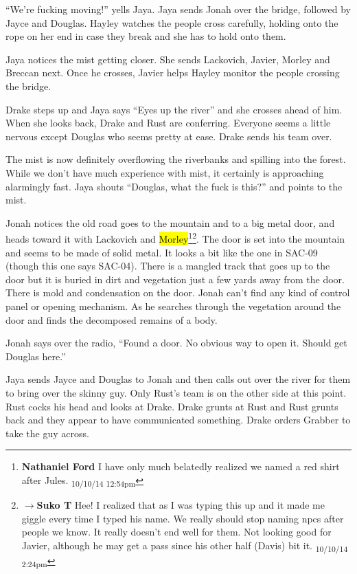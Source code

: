 ``We're fucking moving!'' yells Jaya.  Jaya sends Jonah over the bridge, followed by Jayce and Douglas.   Hayley watches the people cross carefully, holding onto the rope on her end in case they break and she has to hold onto them.

Jaya notices the mist getting closer.  She sends Lackovich, Javier, Morley and Breccan next.  Once he crosses, Javier helps Hayley monitor the people crossing the bridge.  

Drake steps up and Jaya says ``Eyes up the river'' and she crosses ahead of him.  When she looks back, Drake and Rust are conferring.  Everyone seems a little nervous except Douglas who seems pretty at ease.  Drake sends his team over.  

The mist is now definitely overflowing the riverbanks and spilling into the forest.  While we don't have much experience with mist, it certainly is approaching alarmingly fast.  Jaya shouts ``Douglas, what the fuck is this?'' and points to the mist.



Jonah notices the old road goes to the mountain and to a big metal door, and heads toward it with Lackovich and \hl{Morley}\footnote{\textbf{Nathaniel Ford }I have only much belatedly realized we named a red shirt after Jules. \textsubscript{10/10/14 12:54pm}}\footnote{$\rightarrow$\textbf{Suko T }Hee!  I realized that as I was typing this up and it made me giggle every time I typed his name.  We really should stop naming npcs after people we know.  It really doesn't end well for them.  Not looking good for Javier, although he may get a pass since his other half (Davis) bit it. \textsubscript{10/10/14 2:24pm}}.  The door is set into the mountain and seems to be made of solid metal.  It looks a bit like the one in SAC-09 (though this one says SAC-04).  There is a mangled track that goes up to the door but it is buried in dirt and vegetation just a few yards away from the door.  There is mold and condensation on the door.  Jonah can't find any kind of control panel or opening mechanism.  As he searches through the vegetation around the door and finds the decomposed remains of a body.

Jonah says over the radio, ``Found a door.  No obvious way to open it.  Should get Douglas here.''

Jaya sends Jayce and Douglas to Jonah and then calls out over the river for them to bring over the skinny guy.  Only Rust's team is on the other side at this point.  Rust cocks his head and looks at Drake.  Drake grunts at Rust and Rust grunts back and they appear to have communicated something.  Drake orders Grabber to take the guy across.

